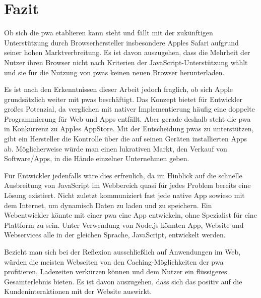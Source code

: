 \section{Fazit}

Ob sich die \ac{pwa} etablieren kann steht und fällt mit der zukünftigen Unterstützung durch Browserhersteller insbesondere Apples Safari aufgrund seiner hohen Marktverbreitung. Es ist davon auszugehen, dass die Mehrheit der Nutzer ihren Browser nicht nach Kriterien der JavaScript-Unterstützung wählt und sie für die Nutzung von \ac{pwa}s keinen neuen Browser herunterladen.

Es ist nach den Erkenntnissen dieser Arbeit jedoch fraglich, ob sich Apple grundsätzlich weiter mit \ac{pwa}s beschäftigt. Das Konzept bietet für Entwickler großes Potenzial, da verglichen mit nativer Implementierung häufig eine doppelte Programmierung für Web und Apps entfällt. Aber gerade deshalb steht die \ac{pwa} in Konkurrenz zu Apples AppStore. Mit der Entscheidung \ac{pwa}s zu unterstützen, gibt ein Hersteller die Kontrolle über die auf seinen Geräten installierten Apps ab. 
Möglicherweise würde man einen lukrativen Markt, den Verkauf von Software/Apps, in die Hände einzelner Unternehmen geben.

Für Entwickler jedenfalls wäre dies erfreulich, da im Hinblick auf die schnelle Ausbreitung von JavaScript im Webbereich quasi für jedes Problem bereits eine Lösung existiert. Nicht zuletzt kommuniziert fast jede native App sowieso mit dem Internet, um dynamisch Daten zu laden und zu speichern. Ein Webentwickler könnte mit einer \ac{pwa} eine App entwickeln, ohne Spezialist für eine Plattform zu sein. Unter Verwendung von Node.js könnten App, Website und Webservices alle in der gleichen Sprache, JavaScript, entwickelt werden.

Bezieht man sich bei der Reflexion ausschließlich auf Anwendungen im Web, würden die meisten Webseiten von den Caching-Möglichkeiten der \ac{pwa} profitieren, Ladezeiten verkürzen können und dem Nutzer ein flüssigeres Gesamterlebnis bieten. Es ist davon auszugehen, dass sich das positiv auf die Kundeninteraktionen mit der Website auswirkt.
